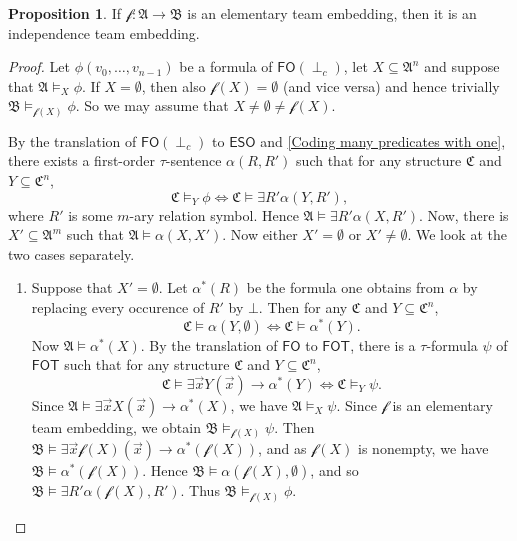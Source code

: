 \documentclass[a4paper]{amsart}
\theoremstyle{definition}
\newtheorem{proposition}[definition]{Proposition}
\theoremstyle{remark}
\newcommand{\A}{\mathcal{A}}
\newcommand{\B}{\mathcal{B}}
\newcommand{\C}{\mathcal{C}}
\newcommand{\vx}{\vec{x}}
\newcommand\fol{\mathsf{FO}}
\newcommand\fot{\mathsf{FOT}}
\newcommand\eso{\mathsf{ESO}}
\newcommand\foil{\mathsf{FO}(\perp_c)}
\theoremstyle{definition}
\renewcommand{\A}{\mathfrak{A}}
\renewcommand{\B}{\mathfrak{B}}
\renewcommand{\C}{\mathfrak{C}}
\newcommand{\f}{\mathcal{f}}
\begin{document}
\begin{proposition}\label{elementary.team.embeddings.are.independence}
    If $\f\colon\A\to\B$ is an elementary team embedding, then it is an independence team embedding.
\end{proposition}
\begin{proof}
    Let $\phi(v_0,\dots,v_{n-1})$ be a formula of $\foil$, let $X\subseteq\A^n$ and suppose that $\A\models_X\phi$. If $X=\emptyset$, then also $\f(X)=\emptyset$ (and vice versa) and hence trivially $\B\models_{\f(X)}\phi$. So we may assume that $X\neq\emptyset\neq \f(X)$.

    By the translation of $\foil$ to $\eso$ and \cref{Coding many predicates with one}, there exists a first-order $\tau$-sentence $\alpha(R,R')$ such that for any structure $\C$ and $Y\subseteq\C^n$,
    \[
        \C\models_Y\phi \iff \C\models\exists R'\alpha(Y,R'),
    \]
    where $R'$ is some $m$-ary relation symbol. Hence $\A\models\exists R'\alpha(X,R')$. Now, there is $X'\subseteq\A^m$ such that $\A\models\alpha(X,X')$.
    Now either $X'=\emptyset$ or $X'\neq\emptyset$. We look at the two cases separately.
    \begin{enumerate}
        \item Suppose that $X'=\emptyset$. Let $\alpha^*(R)$ be the formula one obtains from $\alpha$ by replacing every occurence of $R'$ by $\bot$. Then for any $\C$ and $Y\subseteq\C^n$,
        \[
            \C\models\alpha(Y,\emptyset) \iff \C\models\alpha^*(Y).
        \]
        Now $\A\models\alpha^*(X)$. By the translation of $\fol$ to $\fot$, there is a $\tau$-formula $\psi$ of $\fot$ such that for any structure $\C$ and $Y\subseteq\C^n$,
        \[
            \C\models\exists\vx Y(\vx)\to\alpha^*(Y) \iff \C\models_Y\psi.
        \]
        Since $\A\models\exists\vx X(\vx)\to\alpha^*(X)$, we have $\A\models_X\psi$. Since $\f$ is an elementary team embedding, we obtain $\B\models_{\f(X)}\psi$. Then $\B\models\exists\vx \f(X)(\vx)\to\alpha^*(\f(X))$, and as $\f(X)$ is nonempty, we have $\B\models\alpha^*(\f(X))$. Hence $\B\models\alpha(\f(X),\emptyset)$, and so $\B\models\exists R'\alpha(\f(X),R')$. Thus $\B\models_{\f(X)}\phi$.


\end{enumerate}
\end{proof}
\end{document}
